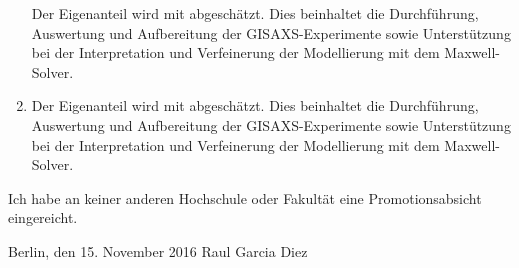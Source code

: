 \begin{enumerate}
        Der Eigenanteil wird mit  abgeschätzt.
        Dies beinhaltet die Durchführung, Auswertung und Aufbereitung der GISAXS-Experimente sowie Unterstützung bei der Interpretation und Verfeinerung der Modellierung mit dem Maxwell-Solver.

    \item \cite{vicent_polymer_2006}

        Der Eigenanteil wird mit  abgeschätzt.
        Dies beinhaltet die Durchführung, Auswertung und Aufbereitung der GISAXS-Experimente sowie Unterstützung bei der Interpretation und Verfeinerung der Modellierung mit dem Maxwell-Solver.

\end{enumerate}


Ich habe an keiner anderen Hochschule oder Fakultät eine Promotionsabsicht eingereicht.

\vspace{3cm}

\noindent Berlin, den 15. November 2016 \hfill Raul Garcia Diez

\cleardoublepage
